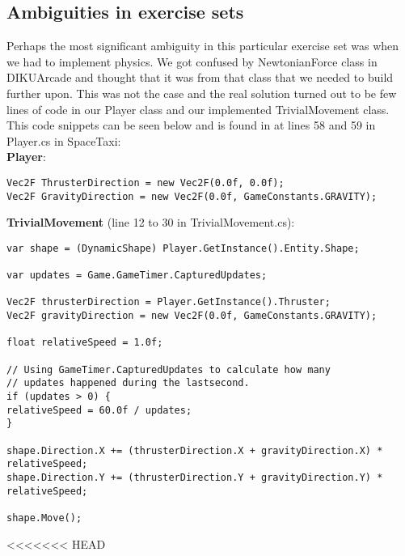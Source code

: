 \documentclass[../master.tex]{subfile}
\begin{document}
\subsection{Ambiguities in exercise sets}
Perhaps the most significant ambiguity in this particular exercise set was when we had to implement physics. We got confused by NewtonianForce class in DIKUArcade and thought that it was from that class that we needed to build further upon. This was not the case and the real solution turned out to be few lines of code in our Player class and our implemented TrivialMovement class. This code snippets can be seen below and is found in at lines 58 and 59 in Player.cs in SpaceTaxi:\\

\textbf{Player}:
\small{
\begin{lstlisting}
Vec2F ThrusterDirection = new Vec2F(0.0f, 0.0f);
Vec2F GravityDirection = new Vec2F(0.0f, GameConstants.GRAVITY);
\end{lstlisting}
}

\textbf{TrivialMovement} (line 12 to 30 in TrivialMovement.cs):
\small{
\begin{lstlisting}
var shape = (DynamicShape) Player.GetInstance().Entity.Shape;

var updates = Game.GameTimer.CapturedUpdates;

Vec2F thrusterDirection = Player.GetInstance().Thruster;
Vec2F gravityDirection = new Vec2F(0.0f, GameConstants.GRAVITY);

float relativeSpeed = 1.0f;

// Using GameTimer.CapturedUpdates to calculate how many
// updates happened during the lastsecond.
if (updates > 0) {
relativeSpeed = 60.0f / updates;
}

shape.Direction.X += (thrusterDirection.X + gravityDirection.X) * relativeSpeed;
shape.Direction.Y += (thrusterDirection.Y + gravityDirection.Y) * relativeSpeed;

shape.Move();
\end{lstlisting}
<<<<<<< HEAD
}
\end{document}
